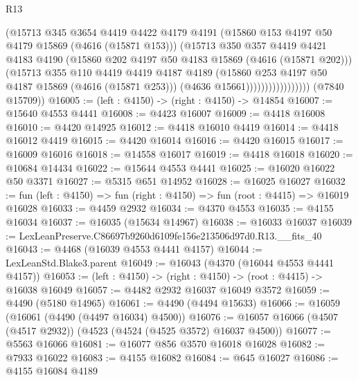 \begin{lexlean}{R13}
\begin{coremodule}
                                (@15713
                                  @345
                                  @3654
                                  @4419
                                  @4422
                                  @4179
                                  @4191
                                  (@15860 @153 @4197 @50 @4179 @15869 (@4616 (@15871 @153)))
                                  (@15713
                                    @350
                                    @357
                                    @4419
                                    @4421
                                    @4183
                                    @4190
                                    (@15860 @202 @4197 @50 @4183 @15869 (@4616 (@15871 @202)))
                                    (@15713
                                      @355
                                      @110
                                      @4419
                                      @4419
                                      @4187
                                      @4189
                                      (@15860 @253 @4197 @50 @4187 @15869 (@4616 (@15871 @253)))
                                      (@4636 @15661)))))))))))))))))
      (@7840 @15709))
@16005 := (left : @4150) -> (right : @4150) -> @14854
@16007 := @15640 @4553 @4441
@16008 := @4423 @16007
@16009 := @4418 @16008
@16010 := @4420 @14925
@16012 := @4418 @16010 @4419
@16014 := @4418 @16012 @4419
@16015 := @4420 @16014
@16016 := @4420 @16015
@16017 := @16009 @16016
@16018 := @14558 @16017
@16019 := @4418 @16018
@16020 := @10684 @14434
@16022 := @15644 @4553 @4441
@16025 := @16020 @16022 @50 @3371
@16027 := @5315 @651 @14952
@16028 := @16025 @16027
@16032 := fun (left : @4150) => fun (right : @4150) => fun (root : @4415) => @16019 @16028
@16033 := @4459 @2932
@16034 := @4370 @4553
@16035 := @4155 @16034
@16037 := @16035 (@15634 @14967)
@16038 := @16033 @16037
@16039 := LexLeanPreserve.C86697b9260d6109fe156e213506d97d0.R13.__fits_40
@16043 := @4468 (@16039 @4553 @4441 @4157)
@16044 := LexLeanStd.Blake3.parent
@16049 := @16043 (@4370 (@16044 @4553 @4441 @4157))
@16053 := (left : @4150) -> (right : @4150) -> (root : @4415) -> @16038 @16049
@16057 := @4482 @2932 @16037 @16049 @3572
@16059 := @4490 (@5180 @14965)
@16061 := @4490 (@4494 @15633)
@16066 := @16059 (@16061 (@4490 (@4497 @16034) @4500))
@16076 := @16057 @16066 (@4507 (@4517 @2932)) (@4523 (@4524 (@4525 @3572) @16037 @4500))
@16077 := @5563 @16066
@16081 := @16077 @856 @3570 @16018 @16028
@16082 := @7933 @16022
@16083 := @4155 @16082
@16084 := @645 @16027
@16086 := @4155 @16084 @4189

\end{coremodule}
\end{lexlean}
